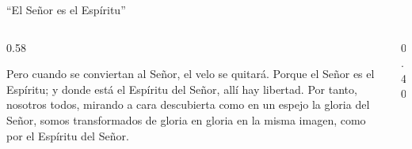 \begin{frame}{``El Señor es el Espíritu''}
\begin{columns}[c,onlytextwidth]
\begin{column}{0.58\textwidth}
\begin{cita}Pero cuando se conviertan al Señor, el velo se quitará. Porque el Señor es el Espíritu; y donde está el Espíritu del Señor, allí hay libertad. Por tanto, nosotros todos, mirando a cara descubierta como en un espejo la gloria del Señor, somos transformados de gloria en gloria en la misma imagen, como por el Espíritu del Señor.\end{cita}
\end{column}
\begin{column}{0.40\textwidth}\end{column}
\end{columns}
\end{frame}

